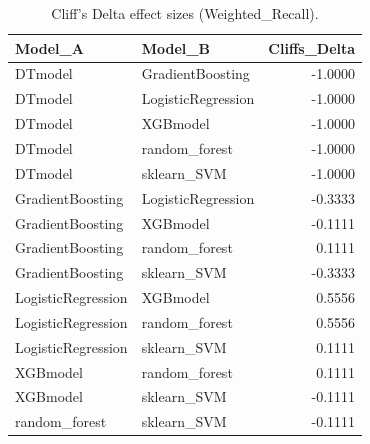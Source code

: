 \begin{table}[t]
\centering
\begin{tabular}{llr}
\toprule
Model_A & Model_B & Cliffs_Delta \\
\midrule
DTmodel & GradientBoosting & -1.0000 \\
DTmodel & LogisticRegression & -1.0000 \\
DTmodel & XGBmodel & -1.0000 \\
DTmodel & random_forest & -1.0000 \\
DTmodel & sklearn_SVM & -1.0000 \\
GradientBoosting & LogisticRegression & -0.3333 \\
GradientBoosting & XGBmodel & -0.1111 \\
GradientBoosting & random_forest & 0.1111 \\
GradientBoosting & sklearn_SVM & -0.3333 \\
LogisticRegression & XGBmodel & 0.5556 \\
LogisticRegression & random_forest & 0.5556 \\
LogisticRegression & sklearn_SVM & 0.1111 \\
XGBmodel & random_forest & 0.1111 \\
XGBmodel & sklearn_SVM & -0.1111 \\
random_forest & sklearn_SVM & -0.1111 \\
\bottomrule
\end{tabular}
\caption{Cliff's Delta effect sizes (Weighted_Recall).}
\label{tab:cliffs_Weighted_Recall}
\end{table}